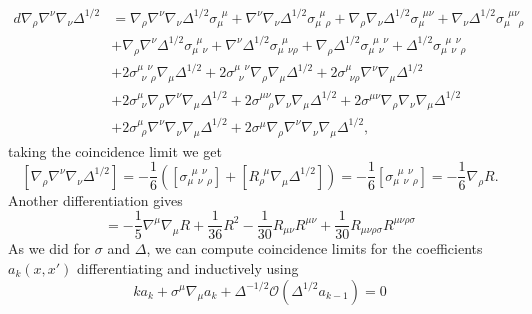 \begin{equation}
\begin{split}
    d \nabla_\rho \nabla^\nu \nabla_\nu \Delta^{1/2} &= \nabla_\rho \nabla^\nu \nabla_\nu\Delta^{1/2} \sigma_\mu^{\;\,\mu} +\nabla^\nu \nabla_\nu \Delta^{1/2}\sigma_{\mu\;\,\rho}^{\;\,\mu} + \nabla_\rho \nabla_\nu \Delta^{1/2} \sigma_\mu^{\;\,\mu\nu} + \nabla_\nu \Delta^{1/2} \sigma^{\;\,\mu\nu}_{\mu\;\;\,\,\rho}\\
    &+ \nabla_\rho \nabla^\nu \Delta^{1/2} \sigma^{\,\;\mu}_{\mu\;\,\nu} + \nabla^\nu \Delta^{1/2}\sigma_{\mu\,\;\nu\rho}^{\,\;\mu} + \nabla_\rho\Delta^{1/2}\sigma_{\mu\,\;\nu}^{\,\;\mu\,\;\nu}+\Delta^{1/2}\sigma_{\mu\,\;\nu\;\,\rho}^{\,\;\mu\,\;\nu}\\
    &+ 2\sigma_{\;\,\nu\,\;\rho}^{\mu\;\,\nu} \nabla_\mu \Delta^{1/2} +2\sigma^{\mu\;\,\nu}_{\;\,\nu}\nabla_\rho \nabla_\mu \Delta^{1/2} + 2\sigma^\mu_{\;\,\nu\rho}\nabla^\nu \nabla_\mu \Delta^{1/2}\\
    &+ 2 \sigma^\mu_{\;\,\nu}\nabla_\rho \nabla^\nu \nabla_\mu \Delta^{1/2} + 2\sigma^{\mu\nu}_{\;\,\;\,\rho} \nabla_\nu \nabla_\mu \Delta^{1/2} +2\sigma^{\mu\nu} \nabla_\rho \nabla_\nu \nabla_\mu \Delta^{1/2}\\
    &+ 2 \sigma^{\mu}_{\;\,\rho} \nabla^\nu \nabla_\nu \nabla_\mu \Delta^{1/2} + 2 \sigma^\mu \nabla_\rho \nabla^\nu \nabla_\nu \nabla_\mu \Delta^{1/2},
\end{split}
\end{equation}
taking the coincidence limit we get
\begin{equation}\label{contracted 3 delta}
    [\nabla_\rho \nabla^\nu \nabla_\nu \Delta^{1/2}]= -\frac{1}{6}([\sigma_{\mu\,\;\nu\,\;\rho}^{\;\,\mu\,\;\nu}] + [R_\rho^{\,\;\mu}\nabla_\mu \Delta^{1/2}]) = -\frac{1}{6} [\sigma_{\mu\,\;\nu\,\;\rho}^{\;\,\mu\,\;\nu}] = -\frac{1}{6} \nabla_\rho R.
\end{equation}
Another differentiation gives
\begin{equation}
    [\nabla^\nu\nabla_\nu\nabla^\mu\nabla_\mu\Delta^{1/2}] = -\frac{1}{5}\nabla^\mu\nabla_\mu R + \frac{1}{36}R^2- \frac{1}{30}R_{\mu\nu}R^{\mu\nu} + \frac{1}{30}R_{\mu\nu\rho\sigma}R^{\mu\nu\rho\sigma}
\end{equation}
As we did for $\sigma$ and $\Delta$, we can compute coincidence limits for the coefficients $a_k(x,x')$ differentiating and inductively using 
\begin{equation}\label{crucial relation for coefficients}
    ka_k + \sigma^\mu \nabla_\mu a_k + \Delta^{-1/2} \mathcal{O}(\Delta^{1/2} a_{k-1})=0
\end{equation}
